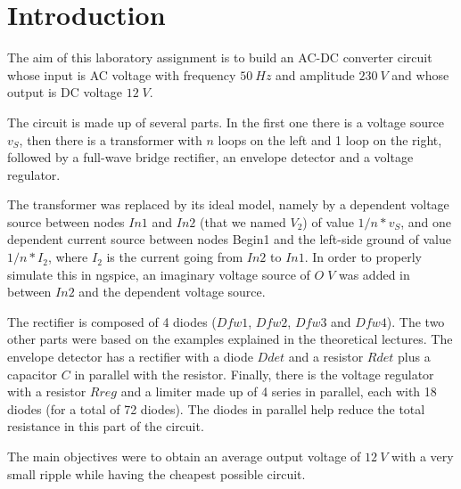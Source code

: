 \section{Introduction}
\label {sec:introduction}


The aim of this laboratory assignment is to build an AC-DC converter circuit whose input is AC voltage with frequency $50 \ Hz$ and amplitude $230 \ V$ and whose output is DC voltage $12 \; V$.


The circuit is made up of several parts. In the first one there is a voltage source $v_S$, then there is a transformer with $n$ loops on the left and 1 loop on the right, followed by a full-wave bridge rectifier, an envelope detector and a voltage regulator.

The transformer was replaced by its ideal model, namely by a dependent voltage source between nodes $In1$ and $In2$ (that we named $V_2$) of value $1/n * v_S$,  and one dependent current source between nodes Begin1 and the left-side ground of value $1/n * I_2$, where $I_2$ is the current going from $In2$ to $In1$. In order to properly simulate this in ngspice, an imaginary voltage source of $O\;V$ was added in between $In2$ and the dependent voltage source.

The rectifier is composed of 4 diodes ($Dfw1$, $Dfw2$, $Dfw3$ and $Dfw4$). The two other parts were based on the examples explained in the theoretical lectures. The envelope detector has a rectifier with a diode $Ddet$ and a resistor $Rdet$ plus a capacitor $C$ in parallel with the resistor. Finally, there is the voltage regulator with a resistor $Rreg$ and a limiter made up of 4 series in parallel, each with 18 diodes (for a total of 72 diodes). The diodes in parallel help reduce the total resistance in this part of the circuit.


The main objectives were to obtain an average output voltage of $12 \ V$ with a very small ripple while having the cheapest possible circuit.

